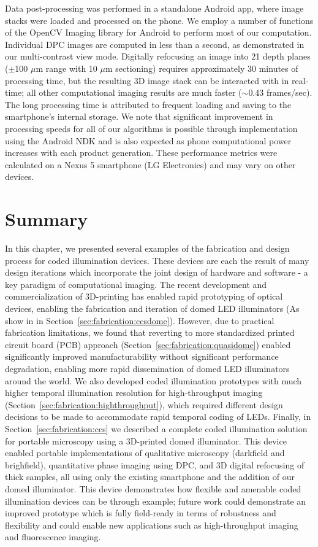 Data post-processing was performed in a standalone Android app, where image stacks were loaded and processed on the phone. We employ a number of functions of the OpenCV Imaging library for Android to perform most of our computation. Individual DPC images are computed in less than a second, as demonstrated in our multi-contrast view mode. Digitally refocusing an image into 21 depth planes ($\pm$100 $\mu$m range with 10 $\mu$m sectioning) requires approximately 30 minutes of processing time, but the resulting 3D image stack can be interacted with in real-time; all other computational imaging results are much faster ($\sim$0.43 frames/sec). The long processing time is attributed to frequent loading and saving to the smartphone's internal storage. We note that significant improvement in processing speeds for all of our algorithms is possible through implementation using the Android NDK and is also expected as phone computational power increases with each product generation. These performance metrics were calculated on a Nexus 5 smartphone (LG Electronics) and may vary on other devices.

\section{Summary}
In this chapter, we presented several examples of the fabrication and design process for coded illumination devices. These devices are each the result of many design iterations which incorporate the joint design of hardware and software - a key paradigm of computational imaging. The recent development and commercialization of 3D-printing has enabled rapid prototyping of optical devices, enabling the fabrication and iteration of domed LED illuminators (As show in in Section~\ref{sec:fabrication:ccsdome}). However, due to practical fabrication limitations, we found that reverting to more standardized printed circuit board (PCB) approach (Section~\ref{sec:fabrication:quasidome}) enabled significantly improved manufacturability without significant performance degradation, enabling more rapid dissemination of domed LED illuminators around the world. We also developed coded illumination prototypes with much higher temporal illumination resolution for high-throughput imaging (Section~\ref{sec:fabrication:highthroughput}), which required different design decisions to be made to accommodate rapid temporal coding of LEDs. Finally, in Section~\ref{sec:fabrication:ccs} we described a complete coded illumination solution for portable microscopy using a 3D-printed domed illuminator. This device enabled portable implementations of qualitative microscopy (darkfield and brighfield), quantitative phase imaging using DPC, and 3D digital refocusing of thick samples, all using only the existing smartphone and the addition of our domed illuminator. This device demonstrates how flexible and amenable coded illumination devices can be through example; future work could demonstrate an improved prototype which is fully field-ready in terms of robustness and flexibility and could enable new applications such as high-throughput imaging and fluorescence imaging.
